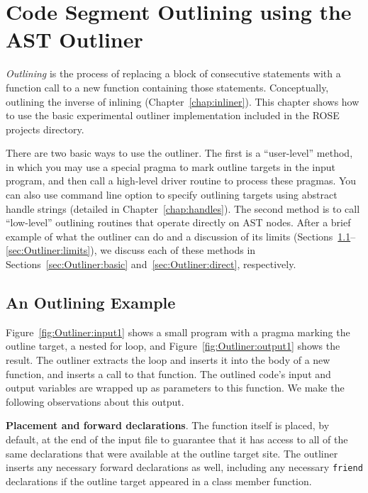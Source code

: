 \chapter{Code Segment Outlining using the AST Outliner}
\label{chap:outliner}

\emph{Outlining} is the process of replacing a block of
consecutive statements with a function call to a new function
containing those statements. Conceptually, outlining the inverse of
inlining (Chapter~\ref{chap:inliner}). This chapter shows how to use
the basic experimental outliner implementation included in the ROSE projects
directory.

There are two basic ways to use the outliner. The first is a
``user-level'' method, in which you may use a special pragma to mark
outline targets in the input program, and then call a high-level
driver routine to process these pragmas. 
You can also use command line option to specify outlining targets using
abstract handle strings (detailed in Chapter~\ref{chap:handles}). 
The second method is to call
``low-level'' outlining routines that operate directly on AST nodes.
After a brief example of what the outliner can do and a discussion
of its limits
(Sections~\ref{sec:Outliner:example}--\ref{sec:Outliner:limits}),
we discuss each of these methods in
Sections~\ref{sec:Outliner:basic} and~\ref{sec:Outliner:direct},
respectively.

\section{An Outlining Example}
\label{sec:Outliner:example}

Figure~\ref{fig:Outliner:input1} shows a small program with a
pragma marking the outline target, a nested for loop, and
Figure~\ref{fig:Outliner:output1} shows the result. The outliner
extracts the loop and inserts it into the body of a new function, and
inserts a call to that function. The outlined code's input and output
variables are wrapped up as parameters to this function. We make the
following observations about this output.

\textbf{Placement and forward declarations}. The function itself is
placed, by default, at the end of the input file to guarantee that it
has access to all of the same declarations that were available at the
outline target site. The outliner inserts any necessary forward
declarations as well, including any necessary \texttt{friend}
declarations if the outline target appeared in a class member
function.

